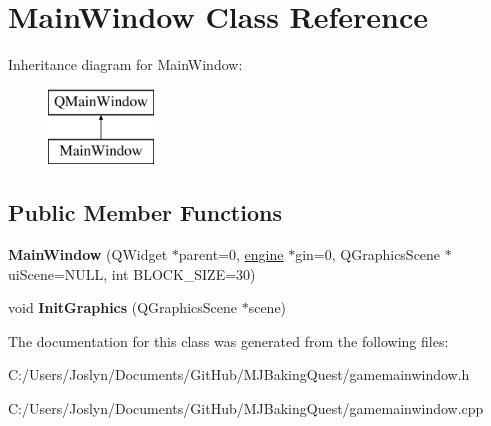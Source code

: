 \hypertarget{class_main_window}{\section{Main\-Window Class Reference}
\label{class_main_window}
}
Inheritance diagram for Main\-Window\-:\begin{figure}[H]
\begin{center}
\leavevmode
\includegraphics[height=2.000000cm]{class_main_window}
\end{center}
\end{figure}
\subsection*{Public Member Functions}
\begin{DoxyCompactItemize}
\item 
\hypertarget{class_main_window_a100ead45842e8680c9cbfa334a0e30b4}{{\bfseries Main\-Window} (Q\-Widget $\ast$parent=0, \hyperlink{classengine}{engine} $\ast$gin=0, Q\-Graphics\-Scene $\ast$ui\-Scene=N\-U\-L\-L, int B\-L\-O\-C\-K\-\_\-\-S\-I\-Z\-E=30)}\label{class_main_window_a100ead45842e8680c9cbfa334a0e30b4}

\item 
\hypertarget{class_main_window_abbbcd7e315b91ac8ead9d87fa61c9f3c}{void {\bfseries Init\-Graphics} (Q\-Graphics\-Scene $\ast$scene)}\label{class_main_window_abbbcd7e315b91ac8ead9d87fa61c9f3c}

\end{DoxyCompactItemize}


The documentation for this class was generated from the following files\-:\begin{DoxyCompactItemize}
\item 
C\-:/\-Users/\-Joslyn/\-Documents/\-Git\-Hub/\-M\-J\-Baking\-Quest/gamemainwindow.\-h\item 
C\-:/\-Users/\-Joslyn/\-Documents/\-Git\-Hub/\-M\-J\-Baking\-Quest/gamemainwindow.\-cpp\end{DoxyCompactItemize}
